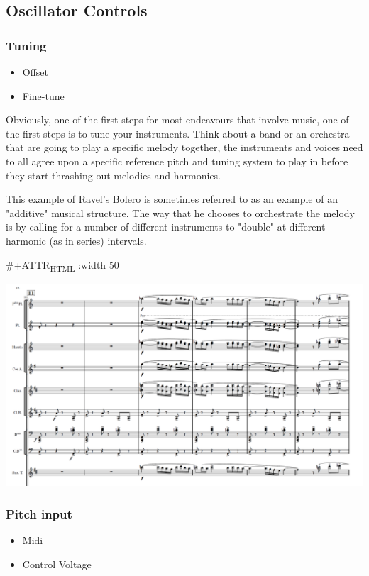 \documentclass[11pt]{article}
\begin{document}
\subsection{Oscillator Controls}
\label{sec:org03a1312}
\subsubsection{Tuning}
\label{sec:orgf5a5511}
\begin{itemize}
\item Offset
\item Fine-tune
\end{itemize}

Obviously, one of the first steps for most endeavours that involve
music, one of the first steps is to tune your instruments. Think about
a band or an orchestra that are going to play a specific melody
together, the instruments and voices need to all agree upon a specific
reference pitch and tuning system to play in before they start
thrashing out melodies and harmonies. 

This example of Ravel's Bolero is sometimes referred to as an example
of an "additive" musical structure. The way that he chooses to
orchestrate the melody is by calling for a number of different
instruments to "double" at different harmonic (as in series)
intervals. 

\#+ATTR\textsubscript{HTML} :width 50
\begin{center}
\includegraphics[width=.9\linewidth]{./images/ravel_bolero.png}
\end{center}


\subsubsection{Pitch input}
\label{sec:orgb10773e}
\begin{itemize}
\item Midi
\item Control Voltage
\end{itemize}
\end{document}
